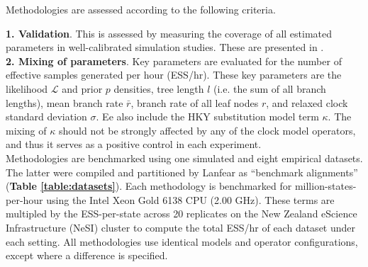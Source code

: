 \documentclass[10pt,letterpaper]{article}
\begin{document}
Methodologies are assessed according to the following criteria.


\textbf{1. Validation}. This is assessed by measuring the coverage of all estimated parameters in well-calibrated simulation studies. These are presented in \textbf{}. \\


\textbf{2. Mixing of parameters}. Key parameters are evaluated for the number of effective samples generated per hour (ESS/hr).
These key parameters are the likelihood $\mathcal{L}$ and prior $p$ densities,  tree length $l$ (i.e. the sum of all branch lengths), mean branch rate $\bar{r}$, branch rate of all leaf nodes $r$, and relaxed clock standard deviation $\sigma$.
Ee also include the HKY substitution model term $\kappa$. 
The mixing of $\kappa$ should not be strongly affected by any of the clock model operators, and thus it serves as a positive control in each experiment. \\




Methodologies are benchmarked using one simulated and eight empirical datasets.
The latter were compiled \cite{lanfear2019Github} and partitioned \cite{lanfear2016partitionfinder} by Lanfear as ``benchmark alignments'' (\textbf{Table \ref{table:datasets}}).
Each methodology is benchmarked for million-states-per-hour using the Intel Xeon Gold 6138 CPU (2.00 GHz).
These terms are multipled by the ESS-per-state across 20 replicates on the New Zealand eScience Infrastructure (NeSI) cluster to compute the total ESS/hr of each dataset under each setting.
All methodologies use identical models and operator configurations, except where a difference is specified.


\end{document}
